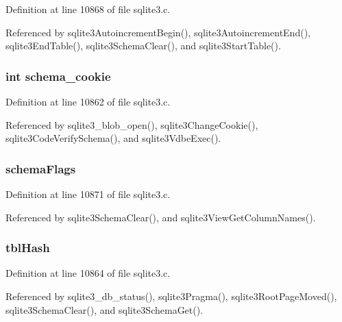 Definition at line 10868 of file sqlite3.\+c.



Referenced by sqlite3\+Autoincrement\+Begin(), sqlite3\+Autoincrement\+End(), sqlite3\+End\+Table(), sqlite3\+Schema\+Clear(), and sqlite3\+Start\+Table().

\hypertarget{struct_schema_afc13a3e8bf268d80381d605f3cbd3875}{}
\subsubsection[{schema\+\_\+cookie}]{\setlength{\rightskip}{0pt plus 5cm}int schema\+\_\+cookie}\label{struct_schema_afc13a3e8bf268d80381d605f3cbd3875}


Definition at line 10862 of file sqlite3.\+c.



Referenced by sqlite3\+\_\+blob\+\_\+open(), sqlite3\+Change\+Cookie(), sqlite3\+Code\+Verify\+Schema(), and sqlite3\+Vdbe\+Exec().

\hypertarget{struct_schema_a8ad465bc0138580015ac7522b584ea91}{}
\subsubsection[{schema\+Flags}]{ schema\+Flags}\label{struct_schema_a8ad465bc0138580015ac7522b584ea91}


Definition at line 10871 of file sqlite3.\+c.



Referenced by sqlite3\+Schema\+Clear(), and sqlite3\+View\+Get\+Column\+Names().

\hypertarget{struct_schema_a65de868624ee47575ce7cc560badd0e7}{}
\subsubsection[{tbl\+Hash}]{ tbl\+Hash}\label{struct_schema_a65de868624ee47575ce7cc560badd0e7}


Definition at line 10864 of file sqlite3.\+c.



Referenced by sqlite3\+\_\+db\+\_\+status(), sqlite3\+Pragma(), sqlite3\+Root\+Page\+Moved(), sqlite3\+Schema\+Clear(), and sqlite3\+Schema\+Get().


